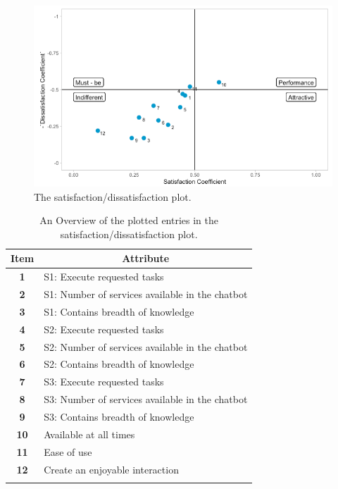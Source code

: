 \begin{figure}[!htb]
	\centering
	\includegraphics[width=\linewidth]{../LaTeX/Figures/Kano/SatisfactionPlot.png}
	\caption{The satisfaction/dissatisfaction plot.}
	\label{fig:satisfactionPlot}
\end{figure}

\begin{longtable}{|c|l|}
	\hline
	\textbf{Item} & \multicolumn{1}{c|}{\textbf{Attribute}}         \\ \hline
	\endfirsthead
	\endhead
	\textbf{1}    & S1: Execute requested tasks                     \\ \hline
	\textbf{2}    & S1: Number of services available in the chatbot \\ \hline
	\textbf{3}    & S1: Contains breadth of knowledge               \\ \hline
	\textbf{4}    & S2: Execute requested tasks                     \\ \hline
	\textbf{5}    & S2: Number of services available in the chatbot \\ \hline
	\textbf{6}    & S2: Contains breadth of knowledge               \\ \hline
	\textbf{7}    & S3: Execute requested tasks                     \\ \hline
	\textbf{8}    & S3: Number of services available in the chatbot \\ \hline
	\textbf{9}    & S3: Contains breadth of knowledge               \\ \hline
	\textbf{10}   & Available at all times                          \\ \hline
	\textbf{11}   & Ease of use                                     \\ \hline
	\textbf{12}   & Create an enjoyable interaction                 \\ \hline
	\caption{An Overview of the plotted entries in the satisfaction/dissatisfaction plot.}
	\label{tab:kanoSatisfactionDissatisfactionTable}
\end{longtable}

